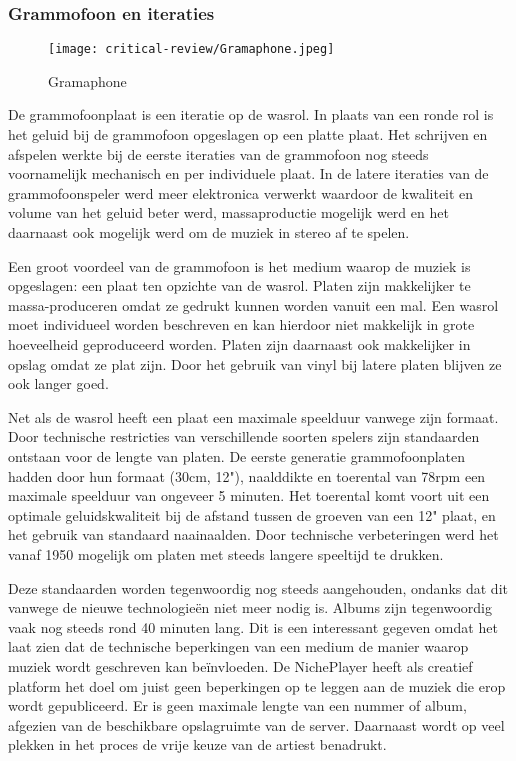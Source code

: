 
\subsubsection*{Grammofoon en iteraties}
\begin{wrapfigure}{r}{0.25\textwidth}
    \centering
    \texttt{[image: critical-review/Gramaphone.jpeg]}
    \caption{Gramaphone}
    \label{fig:critical-review:Gramaphone}
\end{wrapfigure}
De grammofoonplaat is een iteratie op de wasrol. In plaats van een ronde rol is het geluid bij de grammofoon opgeslagen op een platte plaat. Het schrijven en afspelen werkte bij de eerste iteraties van de grammofoon nog steeds voornamelijk mechanisch en per individuele plaat. In de latere iteraties van de grammofoonspeler werd meer elektronica verwerkt waardoor de kwaliteit en volume van het geluid beter werd, massaproductie mogelijk werd en het daarnaast ook mogelijk werd om de muziek in stereo af te spelen.

Een groot voordeel van de grammofoon is het medium waarop de muziek is opgeslagen: een plaat ten opzichte van de wasrol. Platen zijn makkelijker te massa-produceren omdat ze gedrukt kunnen worden vanuit een mal. Een wasrol moet individueel worden beschreven en kan hierdoor niet makkelijk in grote hoeveelheid geproduceerd worden. Platen zijn daarnaast ook makkelijker in opslag omdat ze plat zijn. Door het gebruik van vinyl bij latere platen blijven ze ook langer goed.

Net als de wasrol heeft een plaat een maximale speelduur vanwege zijn formaat. Door technische restricties van verschillende soorten spelers zijn standaarden ontstaan voor de lengte van platen. De eerste generatie grammofoonplaten hadden door hun formaat (30cm, 12"), naalddikte en toerental van 78rpm een maximale speelduur van ongeveer 5 minuten. Het toerental komt voort uit een optimale geluidskwaliteit bij de afstand tussen de groeven van een 12" plaat, en het gebruik van standaard naainaalden. Door technische verbeteringen werd het vanaf 1950 mogelijk om platen met steeds langere speeltijd te drukken. 

Deze standaarden worden tegenwoordig nog steeds aangehouden, ondanks dat dit vanwege de nieuwe technologieën niet meer nodig is. Albums zijn tegenwoordig vaak nog steeds rond 40 minuten lang. Dit is een interessant gegeven omdat het laat zien dat de technische beperkingen van een medium de manier waarop muziek wordt geschreven kan beïnvloeden. De NichePlayer heeft als creatief platform het doel om juist geen beperkingen op te leggen aan de muziek die erop wordt gepubliceerd. Er is geen maximale lengte van een nummer of album, afgezien van de beschikbare opslagruimte van de server. Daarnaast wordt op veel plekken in het proces de vrije keuze van de artiest benadrukt.


